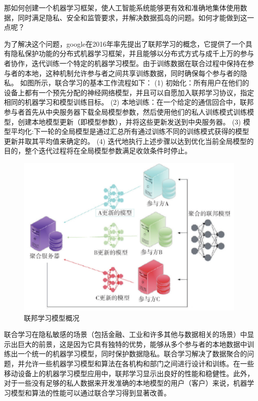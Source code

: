 那如何创建一个机器学习框架，使人工智能系统能够更有效和准确地集体使用数据，同时满足隐私、安全和监管要求，并解决数据孤岛的问题。如何才能做到这一点呢？

为了解决这个问题，google在2016年率先提出了联邦学习的概念\cite{ref3}，它提供了一个具有隐私保护功能的分布式机器学习框架，并且能够以分布式方式与成千上万的参与者协作，迭代训练一个特定的机器学习模型。由于训练数据在联合过程中保持在参与者的本地，这种机制允许参与者之间共享训练数据，同时确保每个参与者的隐私。
如图所示，联合学习的基本工作流程如下：
(1) 初始化：所有用户在他们的设备上都有一个预先分配的神经网络模型，并且可以自愿加入联邦学习协议，指定相同的机器学习和模型训练目标。
(2) 本地训练：在一个给定的通信回合中，联邦参与者首先从中央服务器下载全局模型参数，然后使用他们的私人训练模式训练模型，创建本地模型更新（即模型参数），并将这些更新发送到中央服务器。
(3) 模型平均化:下一轮的全局模型是通过汇总所有通过训练不同的训练模式获得的模型更新并取其平均值来确定的。
(4) 迭代地执行上述步骤以达到优化当前全局模型的目的，整个迭代过程将在全局模型参数满足收敛条件时停止。

\begin{figure}[!hbt]
\centering
	\includegraphics[scale=0.2]{fig2/C1/联邦学习概况}%
	\caption{联邦学习模型概况}
	\label{fig:联邦学习模型概况}	
\end{figure}

联合学习在隐私敏感的场景（包括金融、工业和许多其他与数据相关的场景）中显示出巨大的前景，这是因为它具有独特的优势，能够从多个参与者的本地数据中训练出一个统一的机器学习模型，同时保护数据隐私\cite{ref4}。联合学习解决了数据聚合的问题，并允许一些机器学习模型和算法在各机构和部门之间进行设计和训练。在一些移动设备上的机器学习模型应用中，联邦学习显示出良好的性能和稳健性。此外，对于一些没有足够的私人数据来开发准确的本地模型的用户（客户）来说，机器学习模型和算法的性能可以通过联合学习得到显著改善。

